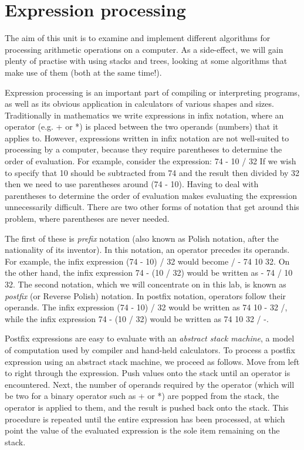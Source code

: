 \documentclass[10pt, a4paper, twosize]{article}
\begin{document}
\section{Expression processing}
The aim of this unit is to examine and implement different algorithms for processing arithmetic operations on a computer. As a side-effect, we will gain plenty of practise with using stacks and trees, looking at some algorithms that make use of them (both at the same time!).

Expression processing is an important part of compiling or interpreting programs, as well as its obvious application in calculators of various shapes and sizes. Traditionally in mathematics we write expressions in infix notation, where an operator (e.g. + or *) is placed between the two operands (numbers) that it applies to. However, expressions written in infix notation are not well-suited to processing by a computer, because they require parentheses to determine the order of evaluation. For example, consider the expression:
74 - 10 / 32 
If we wish to specify that 10 should be subtracted from 74 and the result then divided by 32 then we need to use parentheses around (74 - 10). Having to deal with parentheses to determine the order of evaluation makes evaluating the expression unnecessarily difficult. There are two other forms of notation that get around this problem, where parentheses are never needed. 

The first of these is \emph{prefix} notation (also known as Polish notation, after the nationality of its inventor). In this notation, an operator precedes its operands. For example, the infix expression (74 - 10) / 32 would become / - 74 10 32. On the other hand, the infix expression 74 - (10 / 32) would be written as - 74 / 10 32. The second notation, which we will concentrate on in this lab, is known as \emph{postfix} (or Reverse Polish) notation. In postfix notation, operators follow their operands. The infix expression (74 - 10) / 32 would be written as 74 10 - 32 /, while the infix expression 74 - (10 / 32)  would be written as 74 10 32 / -.

Postfix expressions are easy to evaluate with an \emph{abstract stack machine}, a model of computation used by compiler and hand-held calculators. To process a postfix expression using an abstract stack machine, we proceed as follows. Move from left to right through the expression. Push values onto the stack until an operator is encountered. Next, the number of operands required by the operator (which will be two for a binary operator such as + or *) are popped from the stack, the operator is applied to them, and the result is pushed back onto the stack. This procedure is repeated until the entire expression has been processed, at which point the value of the evaluated expression is the sole item remaining on the stack.
\end{document}
